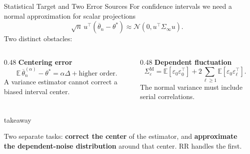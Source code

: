 \documentclass[11pt,aspectratio=169,xcolor=table]{beamer}
\newcommand{\colhead}[1]{\textcolor{ThesisBlue}{\bfseries #1}}
\newcommand{\MC}{\mathrm{M}}
\newcommand{\eps}{\varepsilon}
\newenvironment{takeawaybox}
  {\begin{beamercolorbox}[wd=\linewidth,sep=0.52em,leftskip=0.25em,rightskip=0.25em,rounded=true]{takeaway}%
   \begin{minipage}{0.96\linewidth}%
   \llap{{\color{ThesisGreen}\rule{2.5pt}{2.6ex}}\hspace{0.5em}}}
  {\end{minipage}\end{beamercolorbox}}
\begin{document}
\begin{frame}{Statistical Target and Two Error Sources}
\small
For confidence intervals we need a normal approximation for scalar projections
\[
  \sqrt n\,u^\top(\overline\theta_n-\theta^*)
  \approx\mathcal N(0,u^\top\Sigma_\infty u).
\]
Two distinct obstacles:

\vspace{0.5em}
\begin{columns}[T,onlytextwidth]
  \begin{column}{0.48\textwidth}
    \colhead{Centering error}
    \[
      \mathbb E\,\overline\theta_n^{(\alpha)}-\theta^*
      =\alpha\Delta+\text{higher order}.
    \]
    A variance estimator cannot correct a biased interval center.
  \end{column}
  \begin{column}{0.48\textwidth}
    \colhead{Dependent fluctuation}
    \[
      \Sigma_\eps^{\MC}
      =\mathbb E[\eps_0\eps_0^\top]
       +2\sum_{\ell\geq1}\mathbb E[\eps_0\eps_\ell^\top].
    \]
    The normal variance must include serial correlations.
  \end{column}
\end{columns}

\vspace{0.65em}
\begin{takeawaybox}
Two separate tasks: \textbf{correct the center} of the estimator, and
\textbf{approximate the dependent-noise distribution} around that center.
RR handles the first.
\end{takeawaybox}
\end{frame}
\end{document}
